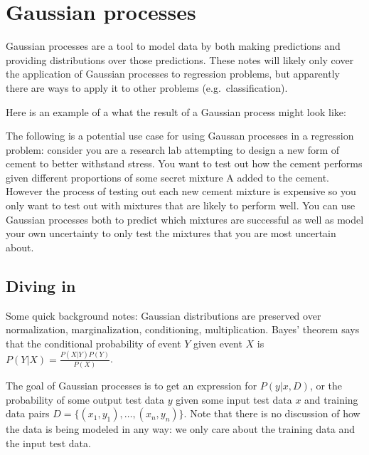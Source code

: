 \documentclass[answers,12pt]{exam}
\begin{document}
\section{Gaussian processes}
Gaussian processes are a tool to model data by both making predictions and providing distributions over those predictions.
These notes will likely only cover the application of Gaussian processes to regression problems, but apparently there are ways to apply it to other problems (e.g.\ classification).

Here is an example of a what the result of a Gaussian process might look like:


The following is a potential use case for using Gaussan processes in a regression problem:
consider you are a research lab attempting to design a new form of cement to better withstand stress.
You want to test out how the cement performs given different proportions of some secret mixture A added to the cement.
However the process of testing out each new cement mixture is expensive so you only want to test out with mixtures that are likely to perform well.
You can use Gaussian processes both to predict which mixtures are successful as well as model your own uncertainty to only test the mixtures that you are most uncertain about.


\subsection{Diving in}
Some quick background notes:
Gaussian distributions are preserved over normalization, marginalization, conditioning, multiplication.
Bayes' theorem says that the conditional probability of event $Y$ given event $X$ is $P(Y|X)=\frac{P(X|Y)P(Y)}{P(X)}$.

The goal of Gaussian processes is to get an expression for $P(y|x,D)$, or the probability of some output test data $y$ given some input test data $x$ and training data pairs $D = \{(x_1, y_1), \dots , (x_n,y_n)\}$.
Note that there is no discussion of how the data is being modeled in any way: we only care about the training data and the input test data.
\end{document}
